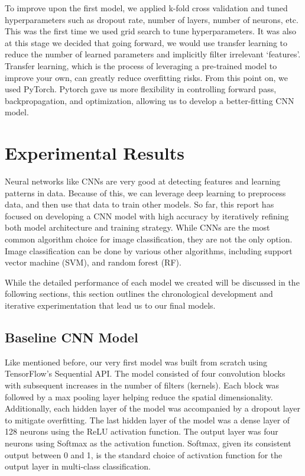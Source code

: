\documentclass[conference]{IEEEtran}
\begin{document}
To improve upon the first model, we applied k-fold cross validation and tuned hyperparameters such as dropout rate, number of layers, number of neurons, etc. This was the first time we used grid search to tune hyperparameters. It was also at this stage we decided that going forward, we would use transfer learning to reduce the number of learned parameters and implicitly filter irrelevant `features'. Transfer learning, which is the process of leveraging a pre-trained model to improve your own, can greatly reduce overfitting risks. From this point on, we used PyTorch. Pytorch gave us more flexibility in controlling forward pass, backpropagation, and optimization, allowing us to develop a better-fitting CNN model.

\section{\large Experimental Results}

Neural networks like CNNs are very good at detecting features and learning patterns in data. Because of this, we can leverage deep learning to preprocess data, and then use that data to train other models. So far, this report has focused on developing a CNN model with high accuracy by iteratively refining both model architecture and training strategy. While CNNs are the most common algorithm choice for image classification, they are not the only option. Image classification can be done by various other algorithms, including support vector machine (SVM), and random forest (RF). 

While the detailed performance of each model we created will be discussed in the following sections, this section outlines the chronological development and iterative experimentation that lead us to our final models.

\subsection{\large Baseline CNN Model}

Like mentioned before, our very first model was built from scratch using TensorFlow's Sequential API. The model consisted of four convolution blocks with subsequent increases in the number of filters (kernels). Each block was followed by a max pooling layer helping reduce the spatial dimensionality. Additionally, each hidden layer of the model was accompanied by a dropout layer to mitigate overfitting. The last hidden layer of the model was a dense layer of 128 neurons using the ReLU activation function. The output layer was four neurons using Softmax as the activation function. Softmax, given its consistent output between 0 and 1, is the standard choice of activation function for the output layer in multi-class classification. 
\end{document}
